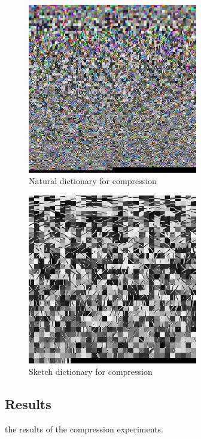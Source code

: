 \newpage
\begin{figure}[H]
\centering
\includegraphics[width = 0.66\textwidth]{images/natural_dict.jpg}
\caption{Natural dictionary for compression}\label{fig:naturalDict}
\end{figure}
\begin{figure}[H]
\centering
\includegraphics[width = 0.66\textwidth]{images/sketch_dict.jpg}
\caption{Sketch dictionary for compression}\label{fig:sketchDict}
\end{figure}


\clearpage
\subsection{Results}

 the results of the compression experiments.

